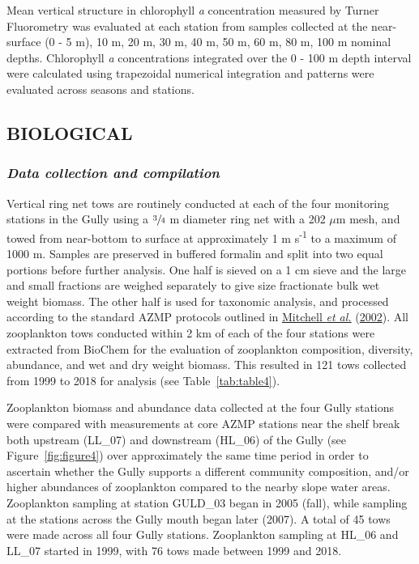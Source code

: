 \documentclass[12pt]{article}\usepackage[]{graphicx}\usepackage[]{color}
\begin{document}
Mean vertical structure in chlorophyll \emph{a} concentration measured by Turner Fluorometry was evaluated at each station from samples collected at the near-surface (0 - 5 m), 10 m, 20 m, 30 m, 40 m, 50 m, 60 m, 80 m, 100 m nominal depths. Chlorophyll \emph{a} concentrations integrated over the 0 - 100 m depth interval were calculated using trapezoidal numerical integration and patterns were evaluated across seasons and stations.

\hypertarget{sec:biological-data}{%
\subsection{\texorpdfstring{\textbf{BIOLOGICAL}}{BIOLOGICAL}}\label{sec:biological-data}}

\hypertarget{data-collection-and-compilation-2}{%
\subsubsection{\texorpdfstring{\emph{Data collection and compilation}}{Data collection and compilation}}\label{data-collection-and-compilation-2}}

Vertical ring net tows are routinely conducted at each of the four monitoring stations in the Gully using a \(\sfrac{3}{4}\) m diameter ring net with a 202 \(\mu\)m mesh, and towed from near-bottom to surface at approximately 1 m s\textsuperscript{-1} to a maximum of 1000 m. Samples are preserved in buffered formalin and split into two equal portions before further analysis. One half is sieved on a 1 cm sieve and the large and small fractions are weighed separately to give size fractionate bulk wet weight biomass. The other half is used for taxonomic analysis, and processed according to the standard AZMP protocols outlined in \protect\hyperlink{ref-mitchell_2002}{Mitchell \textit{et al.}} (\protect\hyperlink{ref-mitchell_2002}{2002}). All zooplankton tows conducted within 2 km of each of the four stations were extracted from BioChem for the evaluation of zooplankton composition, diversity, abundance, and wet and dry weight biomass. This resulted in 121 tows collected from 1999 to 2018 for analysis (see Table~\ref{tab:table4}).

Zooplankton biomass and abundance data collected at the four Gully stations were compared with measurements at core AZMP stations near the shelf break both upstream (LL\_07) and downstream (HL\_06) of the Gully (see Figure~\ref{fig:figure4}) over approximately the same time period in order to ascertain whether the Gully supports a different community composition, and/or higher abundances of zooplankton compared to the nearby slope water areas. Zooplankton sampling at station GULD\_03 began in 2005 (fall), while sampling at the stations across the Gully mouth began later (2007). A total of 45 tows were made across all four Gully stations. Zooplankton sampling at HL\_06 and LL\_07 started in 1999, with 76 tows made between 1999 and 2018.
\end{document}
